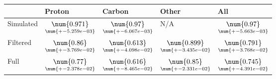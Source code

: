 \begin{tabular}{lllll}
\toprule
{} & Proton & Carbon &  Other & All \\
\midrule
Simulated &  $\underset{\num{+- 5.259e-03 }  }{\num{ 0.971 } }$ &  $\underset{\num{+- 6.067e-03 }  }{\num{ 0.97 } }$ &  N/A &  $\underset{\num{+- 5.663e-03 }  }{\num{ 0.97 } }$ \\
Filtered  &  $\underset{\num{+- 3.769e-02 }  }{\num{ 0.86 } }$ &  $\underset{\num{+- 4.098e-02 }  }{\num{ 0.613 } }$ &  $\underset{\num{+- 3.435e-02 }  }{\num{ 0.899 } }$ &  $\underset{\num{+- 3.768e-02 }  }{\num{ 0.791 } }$ \\
Full      &  $\underset{\num{+- 2.378e-02 }  }{\num{ 0.77 } }$ &  $\underset{\num{+- 8.465e-02 }  }{\num{ 0.616 } }$ &  $\underset{\num{+- 2.331e-02 }  }{\num{ 0.85 } }$ &  $\underset{\num{+- 4.391e-02 }  }{\num{ 0.745 } }$ \\
\bottomrule
\end{tabular}
